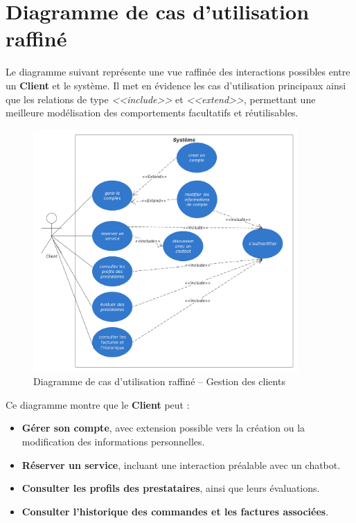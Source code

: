 \section{Diagramme de cas d'utilisation raffiné}

Le diagramme suivant représente une vue raffinée des interactions possibles entre un \textbf{Client} et le système. Il met en évidence les cas d’utilisation principaux ainsi que les relations de type \textit{<<include>>} et \textit{<<extend>>}, permettant une meilleure modélisation des comportements facultatifs et réutilisables.

\begin{figure}[H]
    \centering
    \includegraphics[width=0.9\textwidth]{figures/Diagramme de cas d'utilisation.png}
    \caption{Diagramme de cas d'utilisation raffiné – Gestion des clients}
    \label{fig:usecase_raffine_client}
\end{figure}

\noindent
Ce diagramme montre que le \textbf{Client} peut :
\begin{itemize}
    \item \textbf{Gérer son compte}, avec extension possible vers la création ou la modification des informations personnelles.
    \item \textbf{Réserver un service}, incluant une interaction préalable avec un chatbot.
    \item \textbf{Consulter les profils des prestataires}, ainsi que leurs évaluations.
    \item \textbf{Consulter l’historique des commandes et les factures associées}.
\end{itemize}

